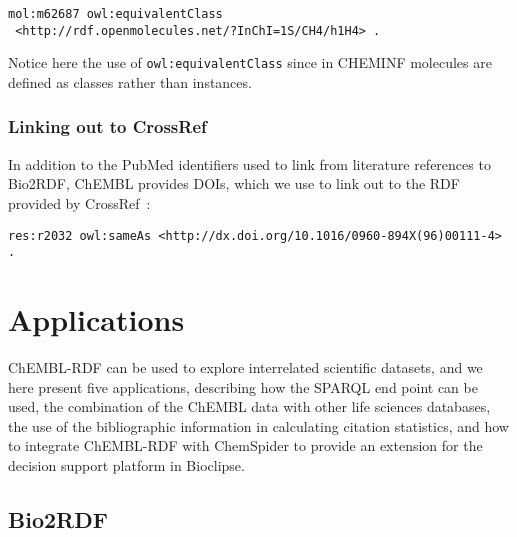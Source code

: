\documentclass[10pt]{bmc_article}
\newenvironment{bmcformat}{\begin{raggedright}\baselineskip20pt\sloppy\setboolean{publ}{false}}{\end{raggedright}\baselineskip20pt\sloppy}
\begin{document}
\begin{bmcformat}
\begin{small}
\begin{verbatim}
mol:m62687 owl:equivalentClass
 <http://rdf.openmolecules.net/?InChI=1S/CH4/h1H4> .
\end{verbatim}
\end{small}

Notice here the use of \verb+owl:equivalentClass+ since in CHEMINF molecules are defined as
classes rather than instances.

\subsubsection*{Linking out to CrossRef}

In addition to the PubMed identifiers used to link from literature references to Bio2RDF,
ChEMBL provides DOIs, which we use to link out to the RDF provided by CrossRef~\cite{Bilder2011}:

\begin{small}
\begin{verbatim}
res:r2032 owl:sameAs <http://dx.doi.org/10.1016/0960-894X(96)00111-4> .
\end{verbatim}
\end{small}

\section*{Applications}

ChEMBL-RDF can be used to explore interrelated scientific datasets, and we here present five applications,
describing how the SPARQL end point can be used, the combination of the ChEMBL data
with other life sciences databases, the use of the bibliographic information in calculating citation
statistics, and how to integrate ChEMBL-RDF with ChemSpider to provide an extension for the decision
support platform in Bioclipse.

\subsection*{Bio2RDF}


\end{bmcformat}
\end{document}
